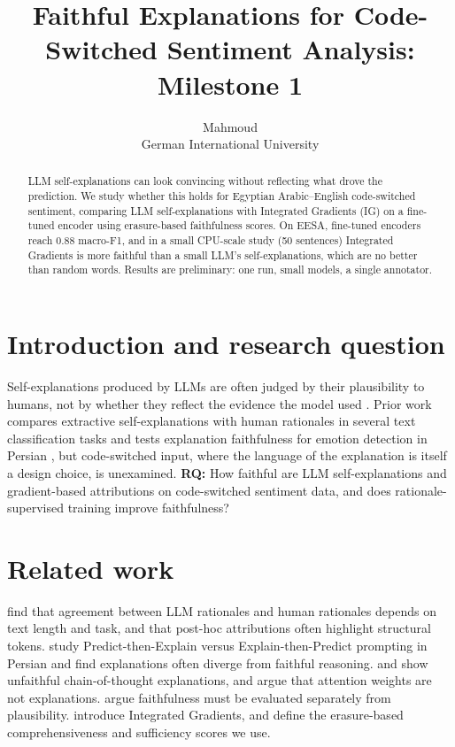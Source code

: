 \documentclass[11pt]{article}
\title{Faithful Explanations for Code-Switched Sentiment Analysis: Milestone 1}
\author{Mahmoud \\ German International University}
\begin{document}
\maketitle

\begin{abstract}
LLM self-explanations can look convincing without reflecting what drove the prediction. We study
whether this holds for Egyptian Arabic--English code-switched sentiment, comparing LLM
self-explanations with Integrated Gradients (IG) on a fine-tuned encoder using erasure-based
faithfulness scores. On EESA, fine-tuned encoders reach 0.88 macro-F1, and in a small CPU-scale study (50 sentences) Integrated Gradients is more faithful than a small LLM's self-explanations, which are no better than random words. Results are preliminary: one run, small models, a single annotator.
\end{abstract}

\section{Introduction and research question}
Self-explanations produced by LLMs are often judged by their plausibility to humans, not by
whether they reflect the evidence the model used \citep{jacovi2020faithfully,turpin2023language}.
Prior work compares extractive self-explanations with human rationales in several text
classification tasks \citep{brandl2024systematic} and tests explanation faithfulness for emotion
detection in Persian \citep{mehrazar2026faithfully}, but code-switched input, where the language of
the explanation is itself a design choice, is unexamined. \textbf{RQ:} How faithful are LLM
self-explanations and gradient-based attributions on code-switched sentiment data, and does
rationale-supervised training improve faithfulness?

\section{Related work}
\citet{brandl2024systematic} find that agreement between LLM rationales and human rationales
depends on text length and task, and that post-hoc attributions often highlight structural tokens.
\citet{mehrazar2026faithfully} study Predict-then-Explain versus Explain-then-Predict prompting in
Persian and find explanations often diverge from faithful reasoning. \citet{turpin2023language} and
\citet{lanham2023measuring} show unfaithful chain-of-thought explanations, and
\citet{jain2019attention} argue that attention weights are not explanations.
\citet{jacovi2020faithfully} argue faithfulness must be evaluated separately from plausibility.
\citet{sundararajan2017axiomatic} introduce Integrated Gradients, and \citet{deyoung2020eraser}
define the erasure-based comprehensiveness and sufficiency scores we use.
\end{document}
